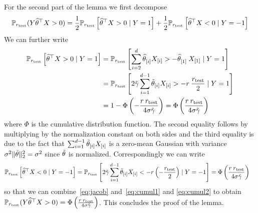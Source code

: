 For the second part of the lemma we first decompose
\begin{equation}
  \label{eq:jacob}
\mathbb{P}_{r_{\text{test}}} (Y\widehat{\theta}^{\top} X >0 ) = \frac{1}{2}\mathbb{P}_{r_{\text{test}}} \left[ \widehat{\theta}^{\top} X >0 \mid Y=1 \right]  +\frac{1}{2}\mathbb{P}_{r_{\text{test}}} \left[\widehat{\theta}^{\top} X <0 \mid Y=-1\right]\nonumber
\end{equation}
We can further write 
\begin{align}
  \label{eq:cumul1}
\mathbb{P}_{r_{\text{test}}} \left[\widehat{\theta}^{\top} X > 0 \mid
  Y = 1\right] &=\mathbb{P}_{r_{\text{test}}} \left[\sum_{i=2}^{d}{\widehat{\theta}^{}}_{[i]} {X}_{[i]} > -
  {\widehat{\theta}^{}}_{[1]} \: {X}_{[1]} \mid Y=1\right]\\
&= \mathbb{P}_{r_{\text{test}}} \left[2 \tilde{\gamma} \sum_{i=1}^{d-1}{\tilde{\theta}}_{[i]} {X}_{[i]} > -
  r \: \frac{r_{\text{test}}}{2} \mid Y=1\right]\nonumber\\
&= 1-\Phi\left(-\frac{r\: r_{\text{test}}}{4\sigma \tilde{\gamma}} \right) =
\Phi\left(\frac{r \: r_{\text{test}}}{4\sigma \tilde{\gamma}} \right) \nonumber
\end{align}
where $\Phi$ is the cumulative distribution function. The second equality
follows by multiplying by the normalization constant on both sides and the
third equality is due to the fact that $\sum_{i=1}^{d-1}{\tilde{\theta}}_{[i]} {X}_{[i]}$ is
a zero-mean Gaussian with variance $\sigma^2\|\tilde{\theta}\|^2_2 = \sigma^2$ since $\tilde{\theta}$ is normalized.
Correspondingly we can write
\begin{align}
  \label{eq:cumul2}
\mathbb{P}_{r_{\text{test}}} \left[\widehat{\theta}^{\top} X < 0 \mid
  Y = -1\right] &=\mathbb{P}_{r_{\text{test}}} \left[2\tilde{\gamma}
  \sum_{i=1}^{d-1}{\tilde{\theta}}_{[i]} {X}_{[i]} < -
  r \left(- \frac{r_{\text{test}}}{2}\right) \mid Y=-1\right] = \Phi\left(\frac{r \:r_{\text{test}}}{4\sigma \tilde{\gamma}}\right) 
\end{align}
so that we can
combine~\eqref{eq:jacob} and~\eqref{eq:cumul1} and \eqref{eq:cumul2} to obtain
$\mathbb{P}_{r_{\text{test}}} (Y\widehat{\theta}^{\top} X >0 ) = \Phi \left(\frac{r \:r_{\text{test}}}{4\sigma \tilde{\gamma}}\right)$. This concludes the proof of the lemma.



